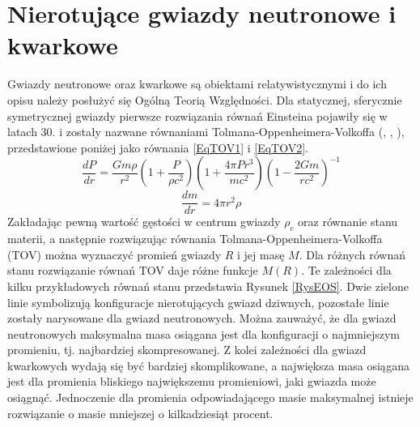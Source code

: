 \documentclass{bachelor_thesis}
\begin{document}
        \section{Nierotujące gwiazdy neutronowe i kwarkowe}
        Gwiazdy neutronowe oraz kwarkowe są obiektami relatywistycznymi i do ich opisu należy posłużyć się Ogólną Teorią Względności. Dla statycznej, sferycznie symetrycznej gwiazdy pierwsze rozwiązania równań Einsteina pojawiły się w latach 30. i zostały nazwane równaniami Tolmana-Oppenheimera-Volkoffa (\citealp{Tolman1934}, \citealp{Tolman1939}, \citealp{Volkoff1939}), przedstawione poniżej jako równania \ref{EqTOV1} i \ref{EqTOV2}.
        \begin{equation}
            \frac{dP}{dr}=\frac{Gm\rho}{r^2}\left(1+\frac{P}{\rho c^2}\right)\left(1+\frac{4\pi Pr^3}{mc^2}\right)\left(1-\frac{2Gm}{rc^2}\right)^{-1}
            \label{EqTOV1}
        \end{equation}
        \begin{equation}
            \frac{dm}{dr}=4\pi r^2\rho
            \label{EqTOV2}
        \end{equation}
        \indent Zakładając pewną wartość gęstości w centrum gwiazdy $\rho_c$ oraz równanie stanu materii, a następnie rozwiązując równania Tolmana-Oppenheimera-Volkoffa (TOV) można wyznaczyć promień gwiazdy $R$ i jej masę $M$. Dla różnych równań stanu rozwiązanie równań TOV daje różne funkcje $M(R)$. Te zależności dla kilku przykładowych równań stanu przedstawia Rysunek \ref{RysEOS}. Dwie zielone linie symbolizują konfiguracje nierotujących gwiazd dziwnych, pozostałe linie zostały narysowane dla gwiazd neutronowych. Można zauważyć, że dla gwiazd neutronowych maksymalna masa osiągana jest dla konfiguracji o najmniejszym promieniu, tj. najbardziej skompresowanej. Z kolei zależności dla gwiazd kwarkowych wydają się być bardziej skomplikowane, a największa masa osiągana jest dla promienia bliskiego największemu promieniowi, jaki gwiazda może osiągnąć. Jednoczenie dla promienia odpowiadającego masie maksymalnej istnieje rozwiązanie o masie mniejszej o kilkadziesiąt procent.
\end{document}
